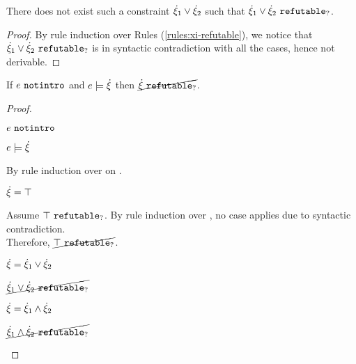 \begin{lemma}
\label{lem:no-or-refutable}
There does not exist such a constraint $\dot{\xi}_1 \vee \dot{\xi}_2$ such that $\dot{\xi}_1 \vee \dot{\xi}_2 ~\mathtt{refutable}_?$.
\end{lemma}
\begin{proof}
By rule induction over Rules (\ref{rules:xi-refutable}), we notice that $\dot{\xi}_1 \vee \dot{\xi}_2 ~\mathtt{refutable}_?$ is in syntactic contradiction with all the cases, hence not derivable.
\end{proof}

\begin{lemma}
\label{lem:satisfy-not-refutable}
If $e ~\mathtt{notintro}$ and $e \models \dot{\xi}$ then $\cancel{\dot{\xi} ~\mathtt{refutable}_?}$.
\end{lemma}
\begin{proof}
\begin{pfsteps*}
\item $e ~\mathtt{notintro}$  
\item $e \models \dot{\xi}$  
\end{pfsteps*}
By rule induction over  on .
\begin{byCases}
\item[\text{(\ref{rule:CSTruth})}]
    \begin{pfsteps*}
    \item $\dot{\xi}=\top$ 
    \end{pfsteps*}
    Assume $\top ~\mathtt{refutable}_?$. By rule induction over , no case applies due to syntactic contradiction.\\
    Therefore, $\cancel{\top ~\mathtt{refutable}_?}$.
\item[\text{(\ref{rule:CSOr1}),(\ref{rule:CSOr2})}]
    \begin{pfsteps*}
    \item $\dot{\xi}=\dot{\xi}_1 \vee \dot{\xi}_2$ 
    \item $\cancel{\dot{\xi}_1 \vee \dot{\xi}_2 ~\mathtt{refutable}_?}$ 
    \end{pfsteps*}
\item[\text{(\ref{rule:CSAnd})}]
    \begin{pfsteps*}
    \item $\dot{\xi}=\dot{\xi}_1 \wedge \dot{\xi}_2$ 
    \item $\cancel{\dot{\xi}_1 \wedge \dot{\xi}_2 ~\mathtt{refutable}_?}$ 

\end{pfsteps*}
\end{byCases}
\end{proof}
